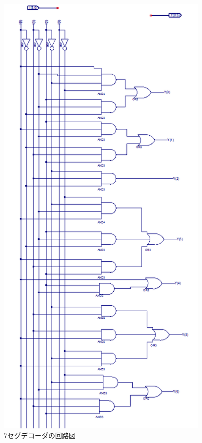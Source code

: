 \begin{figure}[tbp]
   \includegraphics[height=230mm,angle=0]{week2/pics/7seg-sch.png}
   \caption{7セグデコーダの回路図} %
   \label{fig:7seg-dec-sch} %
\end{figure}

